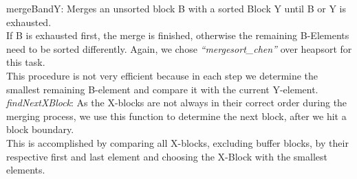 \documentclass[11pt,pdftex,a4paper, twocolumn]{article}
\begin{document}
mergeBandY: Merges an unsorted block B with a sorted Block Y until B or Y is exhausted. \\
If B is exhausted first, the merge is finished, otherwise the remaining B-Elements need to be sorted differently. Again, we chose \textit{“mergesort\_chen”} over heapsort for this task. \\
This procedure is not very efficient because in each step we determine the smallest remaining B-element and compare it with the current Y-element. \\
\textit{findNextXBlock}: As the X-blocks are not always in their correct order during the merging process, we use this function to determine the next block, after we hit a block boundary. \\
This is accomplished by comparing all X-blocks, excluding buffer blocks, by their respective first and last element and choosing the X-Block with the smallest elements.
\end{document}
